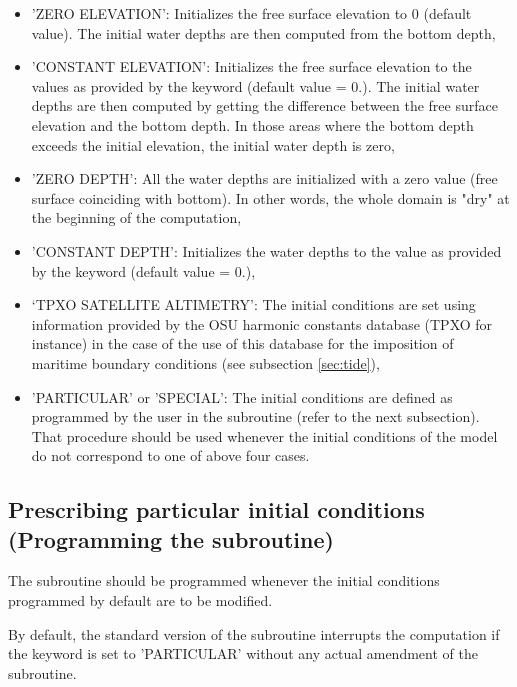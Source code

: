 \begin{itemize}
\item 'ZERO ELEVATION': Initializes the free surface elevation
to 0 (default value). The initial water depths are then computed from the
bottom depth,

\item 'CONSTANT ELEVATION': Initializes the free surface elevation to the
values as provided by the keyword 
(default value = 0.). The initial water
depths are then computed by getting the difference between the free surface
elevation and the bottom depth.  In those areas where the bottom depth exceeds
the initial elevation, the initial water depth is zero,

\item 'ZERO DEPTH': All the water depths are initialized with a zero value
(free surface coinciding with bottom). In other words, the whole domain is
"dry" at the beginning of the computation,

\item 'CONSTANT DEPTH': Initializes the water depths to the value as provided
by the keyword  (default value = 0.),

\item `TPXO SATELLITE ALTIMETRY': The initial conditions are set using
information provided by the OSU harmonic constants database (TPXO for instance)
in the case of the use of this database for the imposition of maritime boundary
conditions (see subsection \ref{sec:tide}),

\item 'PARTICULAR' or 'SPECIAL': The initial conditions are defined as
programmed by the user in the  subroutine (refer to the next
subsection).
That procedure should be used whenever the initial conditions of the model do 
not correspond to one of above four cases.
\end{itemize}


\subsection{Prescribing particular initial conditions (Programming the  subroutine)}
\label{sec:prescr_IC}

The  subroutine should be programmed whenever the initial
conditions programmed by default are to be modified.

By default, the standard version of the  subroutine interrupts
the computation if the keyword  is set to 'PARTICULAR'
without any actual amendment of the subroutine.

